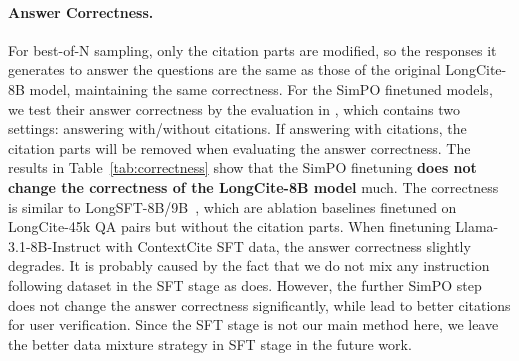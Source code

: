 

\paragraph{Answer Correctness.}
For best-of-N sampling, only the citation parts are modified, so the responses it generates to answer the questions are the same as those of the original LongCite-8B model, maintaining the same correctness. For the SimPO finetuned models, we test their answer correctness by the evaluation in \citet{zhang2024longcite}, which contains two settings: answering with/without citations. If answering with citations, the citation parts will be removed when evaluating the answer correctness.
The results in Table~\ref{tab:correctness} show that the SimPO finetuning \textbf{does not change the correctness of the LongCite-8B model} much. The correctness is similar to LongSFT-8B/9B~\citep{zhang2024longcite}, which are ablation baselines finetuned on LongCite-45k QA pairs but without the citation parts. When finetuning Llama-3.1-8B-Instruct with ContextCite SFT data, the answer correctness slightly degrades. It is probably caused by the fact that we do not mix any instruction following dataset in the SFT stage as \citet{zhang2024longcite} does. However, the further SimPO step does not change the answer correctness significantly, while lead to better citations for user verification. Since the SFT stage is not our main method here, we leave the better data mixture strategy in SFT stage in the future work.
